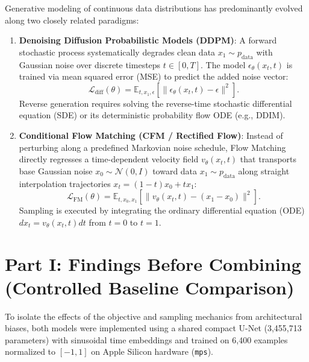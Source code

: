 \documentclass[11pt,a4paper]{article}
\begin{document}
Generative modeling of continuous data distributions has predominantly evolved along two closely related paradigms:
\begin{enumerate}
    \item \textbf{Denoising Diffusion Probabilistic Models (DDPM)}: A forward stochastic process systematically degrades clean data $x_1 \sim p_{\text{data}}$ with Gaussian noise over discrete timesteps $t \in [0, T]$. The model $\epsilon_\theta(x_t, t)$ is trained via mean squared error (MSE) to predict the added noise vector:
    \begin{equation}
        \mathcal{L}_{\text{diff}}(\theta) = \mathbb{E}_{t, x_1, \epsilon} \left[ \|\epsilon_\theta(x_t, t) - \epsilon\|^2 \right].
    \end{equation}
    Reverse generation requires solving the reverse-time stochastic differential equation (SDE) or its deterministic probability flow ODE (e.g., DDIM).
    
    \item \textbf{Conditional Flow Matching (CFM / Rectified Flow)}: Instead of perturbing along a predefined Markovian noise schedule, Flow Matching directly regresses a time-dependent velocity field $v_\theta(x_t, t)$ that transports base Gaussian noise $x_0 \sim \mathcal{N}(0, I)$ toward data $x_1 \sim p_{\text{data}}$ along straight interpolation trajectories $x_t = (1-t)x_0 + t x_1$:
    \begin{equation}
        \mathcal{L}_{\text{FM}}(\theta) = \mathbb{E}_{t, x_0, x_1} \left[ \|v_\theta(x_t, t) - (x_1 - x_0)\|^2 \right].
    \end{equation}
    Sampling is executed by integrating the ordinary differential equation (ODE) $dx_t = v_\theta(x_t, t) dt$ from $t=0$ to $t=1$.
\end{enumerate}

\section{Part I: Findings Before Combining (Controlled Baseline Comparison)}

To isolate the effects of the objective and sampling mechanics from architectural biases, both models were implemented using a shared compact U-Net (3,455,713 parameters) with sinusoidal time embeddings and trained on 6,400 examples normalized to $[-1, 1]$ on Apple Silicon hardware (\texttt{mps}).
\end{document}
